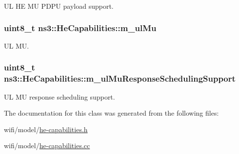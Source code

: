 UL HE MU P\+D\+PU payload support. 

\subsubsection[{\texorpdfstring{m\+\_\+ul\+Mu}{m_ulMu}}]{\setlength{\rightskip}{0pt plus 5cm}uint8\+\_\+t ns3\+::\+He\+Capabilities\+::m\+\_\+ul\+Mu\hspace{0.3cm}{\ttfamily [private]}}\hypertarget{classns3_1_1HeCapabilities_a5e00ff194cfcfb5ea4f7f7262db519a9}{}\label{classns3_1_1HeCapabilities_a5e00ff194cfcfb5ea4f7f7262db519a9}


UL MU. 

\subsubsection[{\texorpdfstring{m\+\_\+ul\+Mu\+Response\+Scheduling\+Support}{m_ulMuResponseSchedulingSupport}}]{\setlength{\rightskip}{0pt plus 5cm}uint8\+\_\+t ns3\+::\+He\+Capabilities\+::m\+\_\+ul\+Mu\+Response\+Scheduling\+Support\hspace{0.3cm}{\ttfamily [private]}}\hypertarget{classns3_1_1HeCapabilities_abb88eec28bfa8f93ea73c3643485d33d}{}\label{classns3_1_1HeCapabilities_abb88eec28bfa8f93ea73c3643485d33d}


UL MU response scheduling support. 



The documentation for this class was generated from the following files\+:\begin{DoxyCompactItemize}
\item 
wifi/model/\hyperlink{he-capabilities_8h}{he-\/capabilities.\+h}\item 
wifi/model/\hyperlink{he-capabilities_8cc}{he-\/capabilities.\+cc}\end{DoxyCompactItemize}
